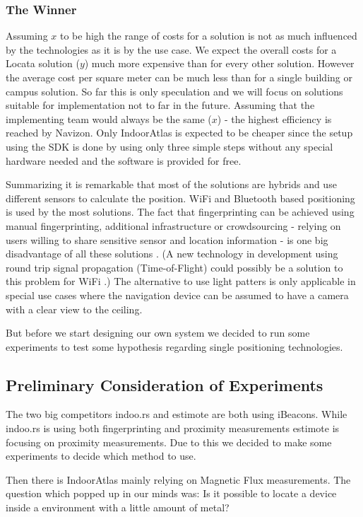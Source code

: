 \subsubsection{The Winner}
Assuming $x$ to be high the range of costs for a solution is not as much influenced by the technologies as it is by the use case. We expect the overall costs for a Locata solution ($y$) much more expensive than for every other solution. However the average cost per square meter can be much less than for a single building or campus solution. So far this is only speculation and we will focus on solutions suitable for implementation not to far in the future. Assuming that the implementing team would always be the same ($x$) - the highest efficiency is reached by Navizon.
Only IndoorAtlas is expected to be cheaper since the setup using the SDK is done by using only three simple steps without any special hardware needed and the software is provided for free. 

Summarizing it is remarkable that most of the solutions are hybrids and use different sensors to calculate the position. WiFi and Bluetooth based positioning is used by the most solutions. The fact that fingerprinting can be achieved using manual fingerprinting, additional infrastructure or crowdsourcing - relying on users willing to share sensitive sensor and location information - is one big disadvantage of all these solutions \parencite{sail}. (A new technology in development using round trip signal propagation (Time-of-Flight) could possibly be a solution to this problem for WiFi \parencite{sail}.) The alternative to use light patters is only applicable in special use cases where the navigation device can be assumed to have a camera with a clear view to the ceiling.


But before we start designing our own system we decided to run some experiments to test some hypothesis regarding single positioning technologies.

\subsection{Preliminary Consideration of Experiments}
The two big competitors indoo.rs and estimote are both using iBeacons. While indoo.rs is using both fingerprinting and proximity measurements estimote is focusing on proximity measurements. Due to this we decided to make some experiments to decide which method to use. 

Then there is IndoorAtlas mainly relying on Magnetic Flux measurements. The question which popped up in our minds was: Is it possible to locate a device inside a environment with a little amount of metal? 

